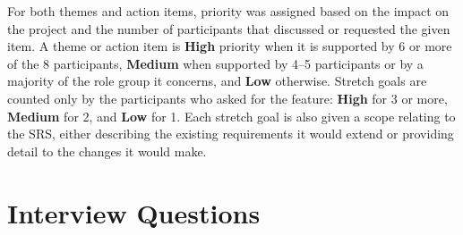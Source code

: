 \documentclass{article}
\begin{document}
For both themes and action items, priority was assigned based on the impact on the project and the number of participants 
that discussed or requested the given item. A theme or action item is \textbf{High} priority when it is supported by 6 or more of the 8 participants, 
\textbf{Medium} when supported by 4--5 participants or by a majority of the role group it concerns, and 
\textbf{Low} otherwise. Stretch goals are counted only by the participants who asked for the feature: 
\textbf{High} for 3 or more, \textbf{Medium} for 2, and \textbf{Low} for 1. Each stretch goal is also given a 
scope relating to the SRS, either describing the existing requirements it would extend or providing detail to the changes 
it would make.

\section{Interview Questions}
\label{sec:questions}
\end{document}
